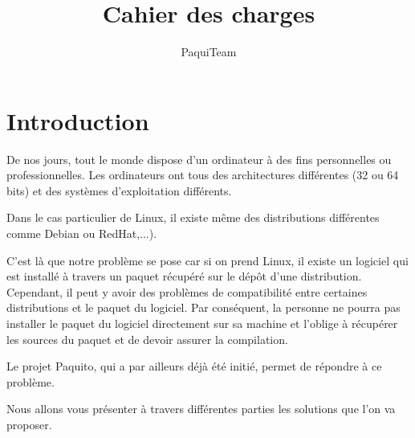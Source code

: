 \documentclass[12pt,a4paper]{article}
\title{Cahier des charges}
\author{PaquiTeam}
\begin{document}


\section*{Introduction}
	De nos jours, tout le monde dispose d'un ordinateur à des fins personnelles ou professionnelles.
Les ordinateurs ont tous des architectures différentes (32 ou 64 bits) et des systèmes d'exploitation différents.

Dans le cas particulier de Linux, il existe même des distributions différentes comme Debian ou RedHat,...).

C'est là que notre problème se pose car si on prend Linux, il existe un logiciel qui est installé à travers un paquet récupéré sur le dépôt d'une distribution. Cependant, il peut y avoir des problèmes de compatibilité entre certaines distributions et le paquet du logiciel. Par conséquent, la personne ne pourra pas installer le paquet du logiciel directement sur sa machine et l'oblige à récupérer les sources du paquet et de devoir assurer la compilation. 

Le projet Paquito, qui a par ailleurs déjà été initié, permet de répondre à ce problème.

Nous allons vous présenter à travers différentes parties les solutions que l'on va proposer.
\end{document}

